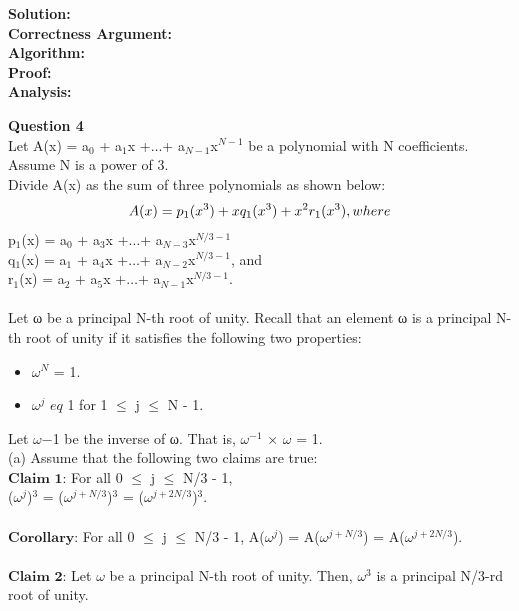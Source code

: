 \documentclass[11pt]{article}
\begin{document}
\textbf{Solution:}\\
\textbf{Correctness Argument:}\\
\textbf{Algorithm:}\\
\textbf{Proof:}\\
\textbf{Analysis:}\\
\clearpage





\textbf{Question 4}\\
 Let A(x) = a$_0$ + a$_{1}$x +$\dots$+ a$_{N-1}$x$^{N-1}$ be a polynomial with N coefficients. Assume N is a power of 3.\\ 
Divide A(x) as the sum of three polynomials as shown below:\\
\begin{equation}
A(x) = p_1(x^3) + xq_1(x^3) + x^2r_1(x^3), where\\
\end{equation}
p$_1$(x) = a$_0$ + a$_{3}$x +$\dots$+ a$_{N-3}$x$^{N/3-1}$\\
q$_1$(x) = a$_1$ + a$_{4}$x +$\dots$+ a$_{N-2}$x$^{N/3-1}$, and\\
r$_1$(x) = a$_2$ + a$_{5}$x +$\dots$+ a$_{N-1}$x$^{N/3-1}$.\\ \\
Let ω be a principal N-th root of unity. Recall that an element ω is a principal N-th root of unity if
it satisfies the following two properties:
\begin{itemize}
\item $\omega$$^N$ = 1.
\item $\omega$$^j$ $
eq$ 1 for 1 $\leq$ j $\leq$ N - 1.
\end{itemize}
Let $\omega$−1 be the inverse of ω. That is, $\omega$$^{-1}$ $\times$ $\omega$ = 1.\\ 
(a) Assume that the following two claims are true:\\
$\textbf{Claim 1:}$ For all 0 $\leq$ j $\leq$ N/3 - 1,\\
($\omega$$^j$)$^3$ = ($\omega$$^{j + N/3}$)$^3$ = ($\omega$$^{j + 2N/3}$)$^3$.\\ \\
$\textbf{Corollary:}$ For all 0 $\leq$ j $\leq$ N/3 - 1, A($\omega$$^j$) = A($\omega$$^{j+N/3}$) = A($\omega$$^{j+2N/3}$).\\ \\
$\textbf{Claim 2:}$ Let $\omega$ be a principal N-th root of unity. Then, $\omega$$^3$
is a principal N/3-rd root of unity.\\ \\
\end{document}
